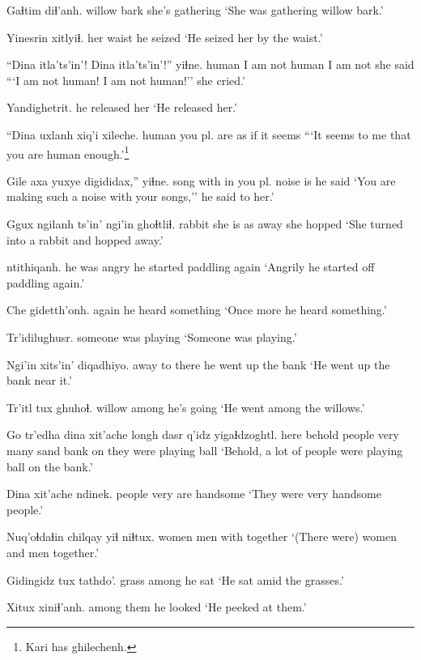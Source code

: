 \documentclass[12pt]{article}
\begin{document}
\gll Gaɬtim diɬ'anh.
{willow bark} {she's gathering}
\glt `She was gathering willow bark.'
\glend

\gll Yinesrin xitlyiɬ.
{her waist} {he seized}
\glt `He seized her by the waist.'
\glend

\gll ``Dina itla'ts'in'! Dina  itla'ts'in'!'' yiɬne.
human {I am not} human {I am not}  {she said}
\glt ```I am not human! I am not human!'' she cried.'
\glend

\gll Yandighetrit.
{{he released her}}
\glt `He released her.'
\glend

\gll ``Dina uxlanh xiq'i xileche.
human {you pl. are} {as if} {it seems}
\glt ```It seems to me that you are human enough.'\footnote{Kari has ghilechenh.}
\glend

\gll Gile axa yuxye digididax,'' yiɬne.
song with {in you pl.} {noise is} {he said}
\glt `You are making such a noise with your songs,'' he said to her.'
\glend

\gll Ggux ngilanh ts'in' ngi'in ghoɬtliɬ.
rabbit {she is} as  away {she hopped}
\glt `She turned into a rabbit and hopped away.'
\glend

 ntithiqanh.
{he was angry} {he started paddling again}
\glt `Angrily he started off paddling again.'
\glend

\gll Che gidetth'onh.
again {he heard something}
\glt `Once more he heard something.'
\glend

\gll Tr'idilughusr.
{{someone was playing}}
\glt `Someone was playing.'
\glend

\gll Ngi'in xits'in' diqadhiyo.
away  {to there} {he went up the bank}
\glt `He went up the bank near it.'
\glend

\gll Tr'itl tux  ghuhoɬ.
willow among {he's going}
\glt `He went among the willows.'
\glend

\gll Go tr'edha dina xit'ache longh dasr q'idz yigaɬdzoghtl.
here behold people very many {sand bank} on {they were playing ball}
\glt `Behold, a lot of people were playing ball on the bank.'
\glend

\gll Dina xit'ache ndinek.
people very {are handsome}
\glt `They were very handsome people.'
\glend

\gll Nuq'oɬdaɬin chilqay yiɬ niɬtux.
women men with together
\glt `(There were) women and men together.'
\glend

\gll Gidingidz tux  tathdo'.
grass  among  {he sat}
\glt `He sat amid the grasses.'
\glend

\gll Xitux xiniɬ'anh.
{among them} {he looked}
\glt `He peeked at them.'
\glend
\end{document}
